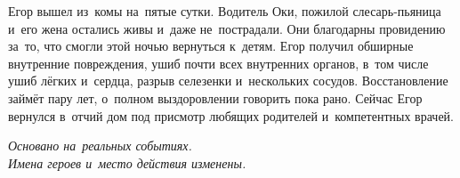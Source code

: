 \vspace{7mm}

Егор вышел из~комы на~пятые сутки.
Водитель Оки, пожилой слесарь-пьяница и~его жена остались живы и~даже не~пострадали.
Они благодарны провидению за~то, что смогли этой ночью вернуться к~детям.
Егор получил обширные внутренние повреждения, ушиб почти всех внутренних органов, в~том числе ушиб лёгких и~сердца, разрыв селезенки и~нескольких сосудов.
Восстановление займёт пару лет, о~полном выздоровлении говорить пока рано.
Сейчас Егор вернулся в~отчий дом под присмотр любящих родителей и~компетентных врачей.

\vspace{7mm}

\textit{Основано на~реальных событиях.\\ Имена героев и~место действия изменены.}
